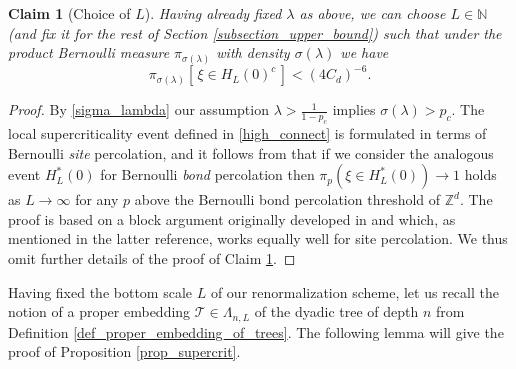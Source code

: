 \documentclass[a4paper,12pt]{article}
\newtheorem  {claim}        [theorem]{Claim}
\begin{document}
\begin{claim}[Choice of $L$]\label{claim_local_supercrit_probab} Having already fixed $\lambda$ as above, we can choose  $L \in \mathbb{N}$ (and fix it for the rest of Section \ref{subsection_upper_bound}) such that
under the product Bernoulli measure $\pi_{\sigma(\lambda)}$ with density $\sigma(\lambda)$  we have
\begin{equation}\label{local_supcrit_prob}
  \pi_{\sigma(\lambda)}\left[ \, \xi \in H_L(0)^c \, \right] <  (4 C_d)^{-6}.
\end{equation}
\end{claim}
\begin{proof}
By \eqref{sigma_lambda} our assumption  $\lambda > \frac{1}{1-p_c}$ implies  $\sigma(\lambda)>p_c $.
The local supercriticality event defined in \eqref{high_connect} is formulated in terms of Bernoulli \emph{site} percolation, and it follows from \cite[Theorem (7.61)]{Gr99} that if we consider the analogous event $H^*_L(0)$ for Bernoulli \emph{bond} percolation then
  $\pi_{p}\left(  \xi \in H^*_L(0) \right) \to 1$ holds as $L \to \infty$ for any $p$  above the Bernoulli bond percolation threshold of $\mathbb{Z}^d$.
  The proof is based on a block argument originally developed in \cite{Pi96} and \cite{DP96} which, as mentioned in the latter reference, works equally well for site percolation. We thus omit further details of the proof of Claim \ref{claim_local_supercrit_probab}.
  \end{proof}

Having fixed the bottom scale $L$ of our renormalization scheme, let us  recall the notion of a proper embedding $\mathcal{T} \in \Lambda_{n,L}$ of the dyadic tree of depth $n$ from Definition \ref{def_proper_embedding_of_trees}. The following lemma will give the proof of Proposition \ref{prop_supercrit}.
\end{document}
